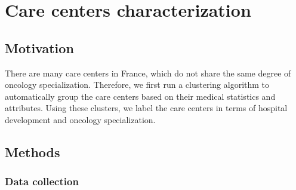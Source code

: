 \chapter{Care centers characterization}

\section{Motivation}

There are many care centers in France, which do not share the same degree of oncology specialization. Therefore, we first run a clustering algorithm to automatically group the care centers based on their medical statistics and attributes. Using these clusters, we label the care centers in terms of hospital development and oncology specialization.

\section{Methods}

\subsection{Data collection}

